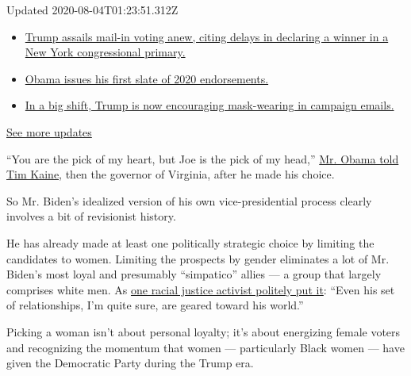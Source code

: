 Updated 2020-08-04T01:23:51.312Z

\begin{itemize}
\tightlist
\item
  \href{https://www.nytimes3xbfgragh.onion/2020/08/03/us/elections/biden-vs-trump.html?action=click\&pgtype=Article\&state=default\&region=MAIN_CONTENT_1\&context=storylines_live_updates\#link-6494b448}{Trump
  assails mail-in voting anew, citing delays in declaring a winner in a
  New York congressional primary.}
\item
  \href{https://www.nytimes3xbfgragh.onion/2020/08/03/us/elections/biden-vs-trump.html?action=click\&pgtype=Article\&state=default\&region=MAIN_CONTENT_1\&context=storylines_live_updates\#link-3de249e6}{Obama
  issues his first slate of 2020 endorsements.}
\item
  \href{https://www.nytimes3xbfgragh.onion/2020/08/03/us/elections/biden-vs-trump.html?action=click\&pgtype=Article\&state=default\&region=MAIN_CONTENT_1\&context=storylines_live_updates\#link-54e34d20}{In
  a big shift, Trump is now encouraging mask-wearing in campaign
  emails.}
\end{itemize}

\href{https://www.nytimes3xbfgragh.onion/2020/08/03/us/elections/biden-vs-trump.html?action=click\&pgtype=Article\&state=default\&region=MAIN_CONTENT_1\&context=storylines_live_updates}{See
more updates}

``You are the pick of my heart, but Joe is the pick of my head,''
\href{https://www.nytimes3xbfgragh.onion/2019/08/16/us/politics/biden-obama-history.html}{Mr.
Obama told Tim Kaine}, then the governor of Virginia, after he made his
choice.

So Mr. Biden's idealized version of his own vice-presidential process
clearly involves a bit of revisionist history.

He has already made at least one politically strategic choice by
limiting the candidates to women. Limiting the prospects by gender
eliminates a lot of Mr. Biden's most loyal and presumably ``simpatico''
allies --- a group that largely comprises white men. As
\href{https://www.washingtonpost.com/politics/biden-under-pressure-to-shatter-cement-ceiling-by-naming-a-black-woman-to-be-his-running-mate/2020/07/19/7dfb9dcc-c06f-11ea-9fdd-b7ac6b051dc8_story.html}{one
racial justice activist politely put it}: ``Even his set of
relationships, I'm quite sure, are geared toward his world.''

Picking a woman isn't about personal loyalty; it's about energizing
female voters and recognizing the momentum that women --- particularly
Black women --- have given the Democratic Party during the Trump era.

